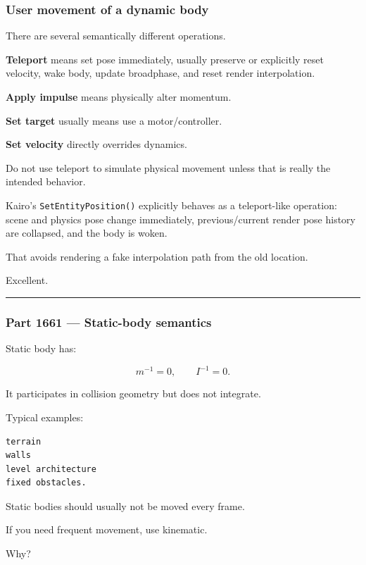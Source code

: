 \subsubsection{User movement of a dynamic body}\label{user-movement-of-a-dynamic-body}

There are several semantically different operations.

\textbf{Teleport} means set pose immediately, usually preserve or explicitly reset velocity, wake body, update broadphase, and reset render interpolation.

\textbf{Apply impulse} means physically alter momentum.

\textbf{Set target} usually means use a motor/controller.

\textbf{Set velocity} directly overrides dynamics.

Do not use teleport to simulate physical movement unless that is really the intended behavior.

Kairo's \texttt{SetEntityPosition()} explicitly behaves as a teleport-like operation: scene and physics pose change immediately, previous/current render pose history are collapsed, and the body is woken.

That avoids rendering a fake interpolation path from the old location.

Excellent.

\begin{center}\rule{0.5\linewidth}{0.5pt}\end{center}

\subsubsection{Part 1661 --- Static-body semantics}\label{part-1661-static-body-semantics}

Static body has:

\[
m^{-1}=0,
\qquad
I^{-1}=0.
\]

It participates in collision geometry but does not integrate.

Typical examples:

\begin{verbatim}
terrain
walls
level architecture
fixed obstacles.
\end{verbatim}

Static bodies should usually not be moved every frame.

If you need frequent movement, use kinematic.

Why?

